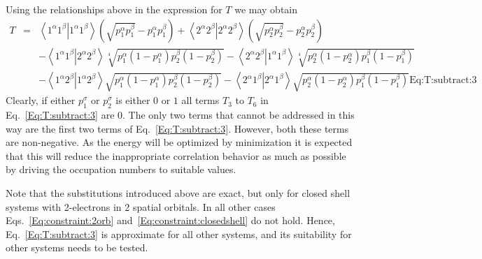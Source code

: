 \documentclass[pra,nofootinbib]{revtex4-1}
\newcommand{\eria}[4]{\left\langle #1^\alpha #2^\beta \right.\left| #3^\alpha #4^\beta \right\rangle}
\newcommand{\dlabel}[1]{\text{#1}\label{#1}}
\begin{document}
Using the relationships above in the expression for $T$ we may obtain
\begin{eqnarray}
   T
   &=& \eria{1}{1}{1}{1} \left(\sqrt{p_1^\alpha p_1^\beta}-p_1^\alpha p_1^\beta\right)
    +  \eria{2}{2}{2}{2} \left(\sqrt{p_2^\alpha p_2^\beta}-p_2^\alpha p_2^\beta\right) \nonumber \\
   &&- \eria{1}{1}{2}{2} \sqrt[4]{p_1^\alpha (1-p_1^\alpha) p_2^\beta (1-p_2^\beta)}
    -  \eria{2}{2}{1}{1} \sqrt[4]{p_2^\alpha (1-p_2^\alpha) p_1^\beta (1-p_1^\beta)} \nonumber \\
   &&- \eria{1}{2}{1}{2} \sqrt{p_1^\alpha (1-p_1^\alpha) p_2^\beta (1-p_2^\beta)}
    -  \eria{2}{1}{2}{1} \sqrt{p_2^\alpha (1-p_2^\alpha) p_1^\beta (1-p_1^\beta)}
   \dlabel{Eq:T:subtract:3}
\end{eqnarray}
Clearly, if either $p_1^\sigma$ or $p_2^\sigma$ is either $0$ or $1$ all terms $T_3$ to $T_6$ in
Eq.~\ref{Eq:T:subtract:3} are $0$. The only two terms that cannot be addressed in this way are the
first two terms of Eq.~\ref{Eq:T:subtract:3}. However, both these terms are non-negative. As the 
energy will be optimized by minimization it is expected that this will reduce the inappropriate
correlation behavior as much as possible by driving the occupation numbers to suitable values.

Note that the substitutions introduced above are exact, but only for closed shell systems with 
2-electrons in 2 spatial orbitals. In all other cases Eqs.~\ref{Eq:constraint:2orb} 
and~\ref{Eq:constraint:closedshell} do not hold. Hence, Eq.~\ref{Eq:T:subtract:3} is approximate
for all other systems, and its suitability for other systems needs to be tested.

\end{document}
